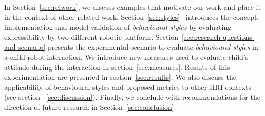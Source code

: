 In Section~\ref{sec:relwork}, we discuss examples that motivate our work and place it in the context of other related work.
Section~\ref{sec:styles} ~introduces the concept, implementation and model validation of \emph{behavioural styles} by evaluating expressibility by two different robotic platform.
Section~\ref{sec:research-questions-and-scenario} presents the experimental scenario to evaluate \emph{behavioural styles} in a child-robot interaction. 
We introduce new measures used to evaluate child's attitude during the interaction in section~\ref{sec:measures}.
Results of this experimentation are presented in section~\ref{sec:results}.
We also discuss the applicability of behavioural styles and proposed metrics to other HRI contexts (see section ~\ref{sec:discussion}).
Finally, we conclude with recommendations for the direction of future research in Section~\ref{sec:conclusion}.

%
%
%
%
%






